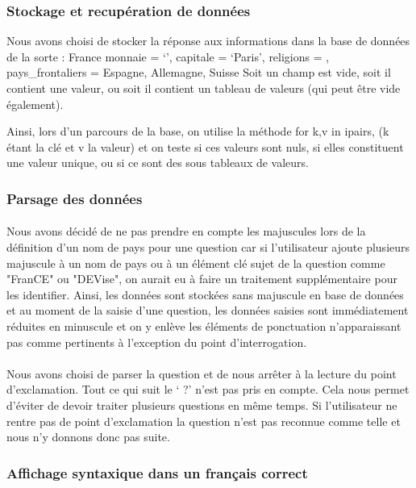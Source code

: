 \documentclass[11pt,a4paper]{article}
\begin{document}
\subsubsection{Stockage et recupération de données}

Nous avons choisi de stocker la réponse aux informations dans la base de données de la sorte :
France {
	monnaie = ‘’,
	capitale = ‘Paris’,
	religions = {},
	pays\_frontaliers = { Espagne, Allemagne, Suisse }
}
Soit un champ est vide, soit il contient une valeur, ou soit il contient un tableau de valeurs (qui peut être vide également). 

Ainsi, lors d'un parcours de la base, on utilise la méthode for k,v in ipairs, (k étant la clé et v la valeur) et on teste si ces valeurs sont nuls, si elles constituent une valeur unique, ou si ce sont des sous tableaux de valeurs. 

\subsubsection{Parsage des données}

\paragraph{}Nous avons décidé de ne pas prendre en compte les majuscules lors de la définition d'un nom de pays pour une question car si l'utilisateur ajoute plusieurs majuscule à un nom de pays ou à un élément clé sujet de la question comme "FranCE" ou "DEVise", on aurait eu à faire un traitement supplémentaire pour les identifier. Ainsi, les données sont stockées sans majuscule en base de données et au moment de la saisie d'une question, les données saisies sont immédiatement réduites en minuscule et on y enlève les éléments de ponctuation n'apparaissant pas comme pertinents à l'exception du point d'interrogation. 
\paragraph{}Nous avons choisi de parser la question et de nous arrêter à la lecture du point d’exclamation. Tout ce qui suit le ‘ ?’ n’est pas pris en compte. Cela nous permet d’éviter de devoir traiter plusieurs questions en même temps. Si l’utilisateur ne rentre pas de point d’exclamation la question n’est pas reconnue comme telle et nous n’y donnons donc pas suite.

\subsubsection{Affichage syntaxique dans un français correct}
\end{document}

